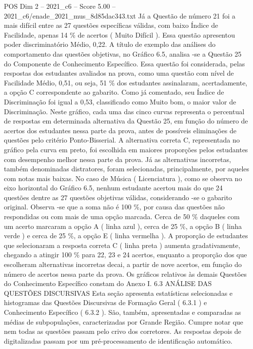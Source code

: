 \begin{textsample}{POS Dim 2 – 2021\_c6 – Score 5.00 – 2021\_c6/enade\_2021\_mus\_8d85dac343.txt}
Já a Questão de número 21 foi a mais difícil entre as 27 questões específicas válidas, com baixo Índice de Facilidade, apenas 14 \% de acertos ( Muito Difícil ).
Essa questão apresentou poder discriminatório Médio, 0,22.
A título de exemplo das análises do comportamento das questões objetivas, no Gráfico 6.5, analisa -se a Questão 25 do Componente de Conhecimento Específico.
Essa questão foi considerada, pelas respostas dos estudantes avaliados na prova, como uma questão com nível de Facilidade Médio, 0,51, ou seja, 51 \% dos estudantes assinalaram, acertadamente, a opção C correspondente ao gabarito.
Como já comentado, seu Índice de Discriminação foi igual a 0,53, classificado como Muito bom, o maior valor de Discriminação.
Neste gráfico, cada uma das cinco curvas representa o percentual de respostas em determinada alternativa da Questão 25, em função do número de acertos dos estudantes nessa parte da prova, antes de possíveis eliminações de questões pelo critério Ponto-Bisserial.
A alternativa correta C, representada no gráfico pela curva em preto, foi escolhida em maiores proporções pelos estudantes com desempenho melhor nessa parte da prova.
Já as alternativas incorretas, também denominadas distratores, foram selecionadas, principalmente, por aqueles com notas mais baixas.
No caso de Música ( Licenciatura ), como se observa no eixo horizontal do Gráfico 6.5, nenhum estudante acertou mais do que 24 questões dentre as 27 questões objetivas válidas, considerando -se o gabarito original.
Observa -se que a soma não é 100 \%, por causa das questões não respondidas ou com mais de uma opção marcada.
Cerca de 50 \% daqueles com um acerto marcaram a opção A ( linha azul ), cerca de 25 \%, a opção B ( linha verde ) e cerca de 25 \%, a opção E ( linha vermelha ).
A proporção de estudantes que selecionaram a resposta correta C ( linha preta ) aumenta gradativamente, chegando a atingir 100 \% para 22, 23 e 24 acertos, enquanto a proporção dos que escolheram alternativas incorretas decai, a partir de nove acertos, em função do número de acertos nessa parte da prova.
Os gráficos relativos às demais Questões do Conhecimento Específico constam do Anexo I. 6.3 ANÁLISE DAS QUESTÕES DISCURSIVAS Esta seção apresenta estatísticas selecionadas e histogramas das Questões Discursivas de Formação Geral ( 6.3.1 ) e Conhecimento Específico ( 6.3.2 ).
São, também, apresentadas e comparadas as médias de subpopulações, caracterizadas por Grande Região.
Cumpre notar que nem todas as questões passam pelo crivo dos corretores.
As respostas depois de digitalizadas passam por um pré-processamento de identificação automático.

\end{textsample}
